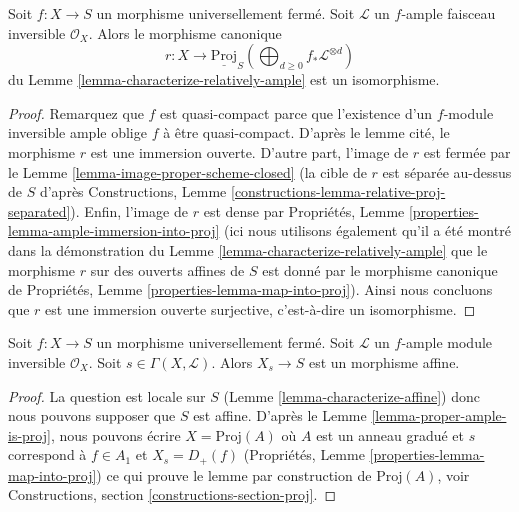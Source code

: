 \begin{lemma}
\label{lemma-proper-ample-is-proj}
Soit $f : X \to S$ un morphisme universellement fermé. Soit
$\mathcal{L}$ un $f$-ample faisceau inversible $\mathcal{O}_X$. Alors
le morphisme canonique
$$
r : X
\longrightarrow
\underline{\text{Proj}}_S
\left(
\bigoplus\nolimits_{d \geq 0} f_*\mathcal{L}^{\otimes d}
\right)
$$
du Lemme \ref{lemma-characterize-relatively-ample} est un isomorphisme.
\end{lemma}

\begin{proof}
Remarquez que $f$ est quasi-compact parce que l'existence
d'un $f$-module inversible ample oblige $f$
à être quasi-compact. D'après le lemme cité, le morphisme
$r$ est une immersion ouverte. D'autre
part, l'image de $r$ est fermée
par le Lemme \ref{lemma-image-proper-scheme-closed} (la cible de $r$ est séparée
au-dessus de $S$ d'après Constructions, Lemme
\ref{constructions-lemma-relative-proj-separated}). Enfin, l'image de $r$
est dense par Propriétés, Lemme \ref{properties-lemma-ample-immersion-into-proj} (ici nous utilisons
également qu'il a été montré dans la démonstration
du Lemme \ref{lemma-characterize-relatively-ample} que le morphisme $r$
sur des ouverts affines de $S$
est donné par le morphisme canonique de
Propriétés, Lemme \ref{properties-lemma-map-into-proj}). Ainsi nous concluons que
$r$ est une immersion ouverte surjective, c'est-à-dire un
isomorphisme.
\end{proof}

\begin{lemma}
\label{lemma-proper-ample-delete-affine}
Soit $f : X \to S$ un morphisme universellement fermé. Soit $\mathcal{L}$
un $f$-ample module inversible $\mathcal{O}_X$.
Soit $s \in \Gamma(X, \mathcal{L})$. Alors $X_s \to S$ est un morphisme affine.
\end{lemma}

\begin{proof}
La question est locale sur $S$ (Lemme \ref{lemma-characterize-affine}) donc
nous pouvons supposer que $S$ est affine. D'après le Lemme
\ref{lemma-proper-ample-is-proj}, nous pouvons écrire $X = \text{Proj}(A)$ où $A$
est un anneau gradué et $s$
correspond à $f \in A_1$ et $X_s = D_+(f)$ (Propriétés, Lemme \ref{properties-lemma-map-into-proj})
ce qui prouve le lemme par construction de $\text{Proj}(A)$,
voir Constructions, section \ref{constructions-section-proj}.
\end{proof}











